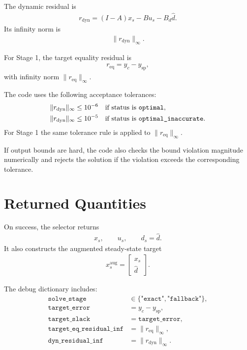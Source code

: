 \documentclass[11pt]{article}
\begin{document}
The dynamic residual is
\begin{align}
    r_{\mathrm{dyn}} = (I-A)x_s - B u_s - B_d \hat d.
\end{align}
Its infinity norm is
\begin{align}
    \|r_{\mathrm{dyn}}\|_{\infty}.
\end{align}

For Stage 1, the target equality residual is
\begin{align}
    r_{\mathrm{eq}} = y_c - y_{\mathrm{sp}},
\end{align}
with infinity norm $\|r_{\mathrm{eq}}\|_{\infty}$.

The code uses the following acceptance tolerances:
\begin{align}
    \|r_{\mathrm{dyn}}\|_{\infty} &\le 10^{-6}
    && \text{if status is \texttt{optimal}}, \\
    \|r_{\mathrm{dyn}}\|_{\infty} &\le 10^{-5}
    && \text{if status is \texttt{optimal\_inaccurate}}.
\end{align}
For Stage 1 the same tolerance rule is applied to $\|r_{\mathrm{eq}}\|_{\infty}$.

If output bounds are hard, the code also checks the bound violation magnitude
numerically and rejects the solution if the violation exceeds the corresponding
tolerance.

\section{Returned Quantities}
On success, the selector returns
\begin{align}
    x_s, \qquad u_s, \qquad d_s = \hat d.
\end{align}
It also constructs the augmented steady-state target
\begin{align}
    x_s^{\mathrm{aug}} = \begin{bmatrix} x_s \\ \hat d \end{bmatrix}.
\end{align}

The debug dictionary includes:
\begin{align}
    \texttt{solve\_stage} &\in \{\texttt{"exact"},\texttt{"fallback"}\}, \\
    \texttt{target\_error} &= y_c - y_{\mathrm{sp}}, \\
    \texttt{target\_slack} &= \texttt{target\_error}, \\
    \texttt{target\_eq\_residual\_inf} &= \|r_{\mathrm{eq}}\|_{\infty}, \\
    \texttt{dyn\_residual\_inf} &= \|r_{\mathrm{dyn}}\|_{\infty}.
\end{align}
\end{document}
